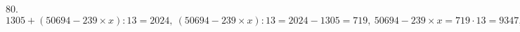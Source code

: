 80. $1305+(50694-239\times x):13=2024,\ (50694-239\times x):13=2024-1305=719,\ 50694-239\times x=719\cdot13=9347,\ 239\times x=50694-9347=41347,\ x=41347:239=173.$
\newpage

